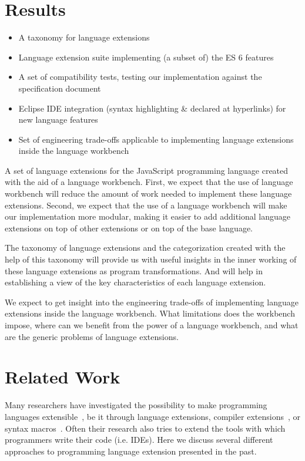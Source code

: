 \section{Results}
\begin{itemize}
	\item A taxonomy for language extensions
	\item Language extension suite implementing (a subset of) the ES 6 features
	\item A set of compatibility tests, testing our implementation against the specification document
	\item Eclipse IDE integration (syntax highlighting \& declared at hyperlinks) for new language features
	\item Set of engineering trade-offs applicable to implementing language extensions inside the language workbench
\end{itemize}

A set of language extensions for the JavaScript programming language created with the aid of a language workbench. First, we expect that the use of language workbench will reduce the amount of work needed to implement these language extensions. Second, we expect that the use of a language workbench will make our implementation more modular, making it easier to add additional language extensions on top of other extensions or on top of the base language. 

The taxonomy of language extensions and the categorization created with the help of this taxonomy will provide us with useful insights in the inner working of these language extensions as program transformations. And will help in establishing a view of the key characteristics of each language extension.

We expect to get insight into the engineering trade-offs of implementing language extensions inside the language workbench. What limitations does the workbench impose, where can we benefit from the power of a language workbench, and what are the generic problems of language extensions.

\section{Related Work} \label{sec:related}
Many researchers have investigated the possibility to make programming languages extensible~\cite{Erdweg2014a,Bravenboer2004}, be it through language extensions, compiler extensions~\cite{Zenger2001,Nystorm2003}, or syntax macros~\cite{Disney2014,Kohlbecker1986,Leavenworth1966,Weise1993}. Often their research also tries to extend the tools with which programmers write their code (i.e. IDEs). Here we discuss several different approaches to programming language extension presented in the past.

